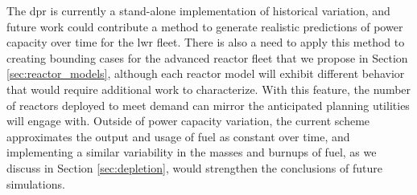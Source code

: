 The \gls{dpr} is currently a stand-alone implementation of historical variation, and future work could contribute a method to generate realistic predictions of power capacity over time for the \gls{lwr} fleet. There is also a need to apply this method to creating bounding cases for the advanced reactor fleet that we propose in Section \ref{sec:reactor_models}, although each reactor model will exhibit different behavior that would require additional work to characterize. With this feature, the number of reactors deployed to meet demand can mirror the anticipated planning utilities will engage with. Outside of power capacity variation, the current scheme approximates the output and usage of fuel as constant over time, and implementing a similar variability in the masses and burnups of fuel, as we discuss in Section \ref{sec:depletion}, would strengthen the conclusions of future \cyclus simulations.


